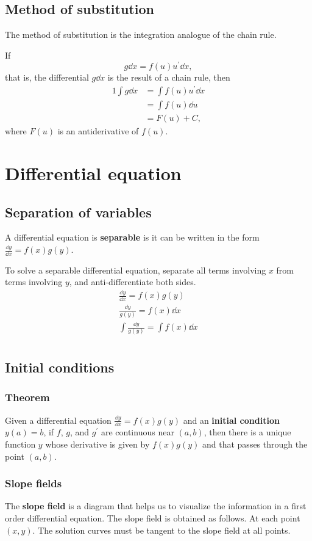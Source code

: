 \subsection{Method of substitution}
The method of substitution is the integration analogue of the chain rule.

If
\[g\dd x=f(u)u^\prime\dd x,\]
that is, the differential $g\dd x$ is the result of a chain rule, then
\begin{alignat*}{1}
\int g\dd x & =\int f(u)u^\prime\dd x\\
            & =\int f(u)\dd u\\
			& =F(u)+C,
\end{alignat*}
where $F(u)$ is an antiderivative of $f(u)$.

\section{Differential equation}
\subsection{Separation of variables}
A differential equation is \textbf{separable} is it can be written in the form $\frac{\dd y}{\dd x}=f(x)g(y)$.

To solve a separable differential equation, separate all terms involving $x$ from terms involving $y$, and anti-differentiate both sides.
\begin{gather*}
\frac{\dd y}{\dd x}=f(x)g(y)\\
\frac{\dd y}{g(y)}=f(x)\dd x\\
\int\frac{\dd y}{g(y)}=\int f(x)\dd x\\
\end{gather*}
\subsection{Initial conditions}
\subsubsection{Theorem}
Given a differential equation $\frac{\dd y}{\dd x}=f(x)g(y)$ and an \textbf{initial condition} $y(a)=b$, if $f$, $g$, and $g^\prime$ are continuous near $(a,b)$, then there is a unique function $y$ whose derivative is given by $f(x)g(y)$ and that passes through the point $(a,b)$.
\subsubsection{Slope fields}
The \textbf{slope field} is a diagram that helps us to visualize the information in a first order differential equation. The slope field is obtained as follows. At each point $(x,y)$. The solution curves must be tangent to the slope field at all points.
